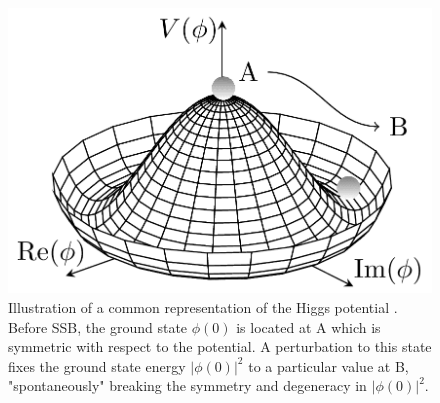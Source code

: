 \documentclass[../thesis.tex]{subfiles}
\begin{document}
\begin{figure}[!htb]
\begin{center}
\includegraphics[width=0.5\linewidth]{fig/theory_higgs_potential.png}
\caption[Illustration of a common representation of the Higgs potential. Before SSB, the ground state $\phi(0)$ is located at A which is symmetric with respect to the potential. A perturbation to this state fixes the ground state energy $|\phi(0)|^2$ to a particular value at B, "spontaneously" breaking the symmetry and degeneracy in $|\phi(0)|^2$.]{\label{fig:theory:higgs_pot}Illustration of a common representation of the Higgs potential \citep{theory:higgs_pot}. Before \acs{SSB}, the ground state $\phi(0)$ is located at A which is symmetric with respect to the potential. A perturbation to this state fixes the ground state energy $|\phi(0)|^2$ to a particular value at B, "spontaneously" breaking the symmetry and degeneracy in $|\phi(0)|^2$.}
\end{center}
\end{figure}
\end{document}
